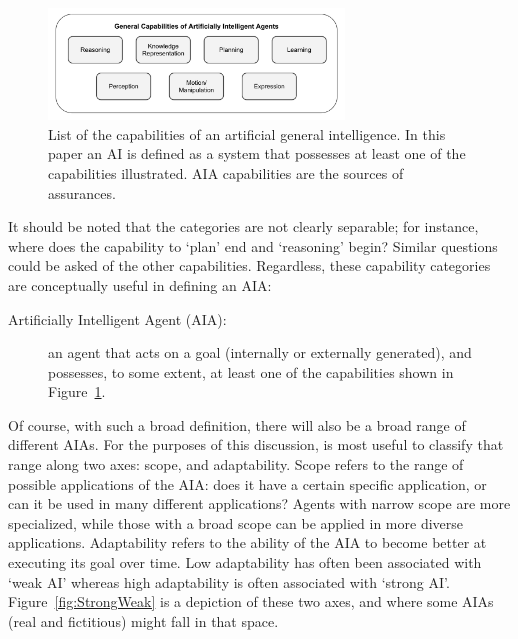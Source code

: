 	\begin{figure}[htbp]
    	\centering
     	\includegraphics[width=0.7\textwidth]{Figures/AI_capabilities}
    	\caption{List of the capabilities of an artificial general intelligence. In this paper an AI is defined as a system that possesses at least one of the capabilities illustrated. AIA capabilities are the sources of assurances.}
        \label{fig:AIcapabilities}
    \end{figure}

    It should be noted that the categories are not clearly separable; for instance, where does the capability to `plan' end and `reasoning' begin? Similar questions could be asked of the other capabilities. Regardless, these capability categories are conceptually useful in defining an AIA:
    
    \begin{description}
        \item[Artificially Intelligent Agent (AIA):] an agent that acts on a goal (internally or externally generated), and possesses, to some extent, at least one of the capabilities shown in Figure~\ref{fig:AIcapabilities}.
    \end{description}

    Of course, with such a broad definition, there will also be a broad range of different AIAs. For the purposes of this discussion, is most useful to classify that range along two axes: scope, and adaptability. Scope refers to the range of possible applications of the AIA: does it have a certain specific application, or can it be used in many different applications? Agents with narrow scope are more specialized, while those with a broad scope can be applied in more diverse applications. Adaptability refers to the ability of the AIA to become better at executing its goal over time. Low adaptability has often been associated with `weak AI' whereas high adaptability is often associated with `strong AI'. Figure~\ref{fig:StrongWeak} is a depiction of these two axes, and where some AIAs (real and fictitious) might fall in that space.

